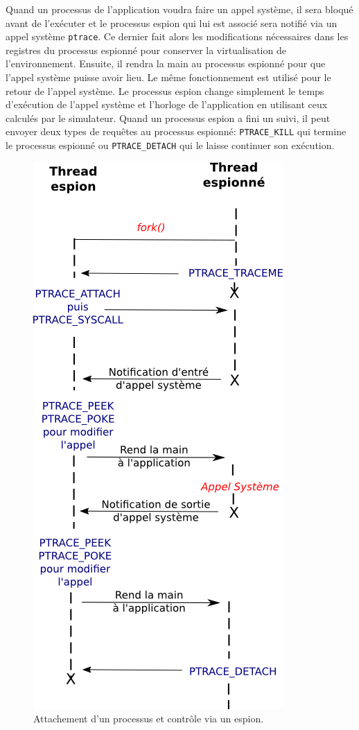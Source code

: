 Quand un processus de l'application voudra faire un appel système, il sera
bloqué avant de l'exécuter et le processus espion qui lui est associé sera
notifié via un appel système \texttt{ptrace}. Ce dernier fait alors les
modifications nécessaires dans les registres du processus espionné pour
conserver la virtualisation de l'environnement. Ensuite, il rendra la main au
processus espionné pour que l'appel système puisse avoir lieu. Le même
fonctionnement est utilisé pour le retour de l'appel système. Le processus
espion change simplement le temps d'exécution de l'appel système et l'horloge de
l'application en utilisant ceux calculés par le simulateur. Quand un processus
espion a fini un suivi, il peut envoyer deux types de requêtes au processus
espionné: \texttt{PTRACE\_KILL} qui termine le processus espionné
ou \texttt{PTRACE\_DETACH} qui le laisse continuer son exécution.

\begin{figure}
\centering
\includegraphics[scale=0.5]{Pictures/png/ptrace_fonctionnement}
\caption{Attachement d'un processus et contrôle via un espion.}
\label{PTRACE_FONCTIONNEMENT}
\end{figure}

